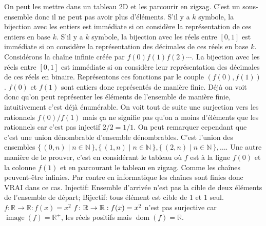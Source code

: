 \begin{mcqs}
  {On peut les mettre dans un tableau 2D et les parcourir en zigzag.}
  {C'est un sous-ensemble donc il ne peut pas avoir plus d'éléments.}
  {S'il y a $k$ symbole, la bijection avec les entiers est immédiate si on considère la représentation de ces entiers en base $k$.}
  {S'il y a $k$ symbole, la bijection avec les réels entre $[0,1]$ est immédiate si on considère la représentation des décimales de ces réels en base $k$.}
  {Considérons la chaîne infinie créée par $f(0)f(1)f(2)\cdots$. La bijection avec les réels entre $[0,1]$ est immédiate si on considère leur représentation des décimales de ces réels en binaire.}
  {Représentons ces fonctions par le couple $(f(0),f(1))$.
  $f(0)$ et $f(1)$ sont entiers donc représentés de manière finie.
  Déjà on voit donc qu'on peut représenter les éléments de l'ensemble de manière finie, intuitivement c'est déjà énumérable.
  On voit tout de suite une surjection vers les rationnels $f(0)/f(1)$
  mais ça ne signifie pas qu'on a moins d'éléments que les rationnels car c'est pas injectif $2/2 = 1/1$.
  On peut remarquer cependant que c'est une union dénombrable d'ensemble dénombrables.
  C'est l'union des ensembles
  $\{\, (0,n) \mid n \in \mathbb{N} \,\},
   \{\, (1,n) \mid n \in \mathbb{N} \,\},
   \{\, (2,n) \mid n \in \mathbb{N} \,\},\ldots$.
  Une autre manière de le prouver, c'est en considérant le tableau où $f$ est à la ligne $f(0)$ et la colonne $f(1)$ et en parcourant le tableau en zigzag.}
  {Comme les chaînes peuvent-être infinies. Par contre en informatique les chaînes sont finies donc VRAI dans ce cas.}
  {Injectif: Ensemble d'arrivée n'est pas la cible de deux éléments de l'ensemble de départ; Bijectif: tous élément est cible de 1 et 1 seul.}
  {$f \colon \mathbb{R}\rightarrow\mathbb{R} : f(x)=x^{2}$}
  {$f \colon \mathbb{R} \to \mathbb{R} : f(x) = x^2$ n'est pas surjective car $\mathop{\mathrm{image}}(f) = \mathbb{R}^+$, les réels positifs mais $\mathop{\mathrm{dom}}(f) = \mathbb{R}$.}

\end{mcqs}
